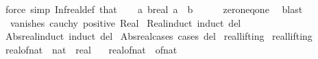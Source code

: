 \begin{isabellebody}
\ {\isacharparenleft}{\kern0pt}force\ simp{\isacharcolon}{\kern0pt}\ Inf{\isacharunderscore}{\kern0pt}real{\isacharunderscore}{\kern0pt}def\ that{\isacharparenright}{\kern0pt}\isanewline
\ \ \isamarkupfalse%
\ {\isachardoublequoteopen}{\isasymexists}a\ b{\isacharcolon}{\kern0pt}{\isacharcolon}{\kern0pt}real{\isachardot}{\kern0pt}\ a\ {\isasymnoteq}\ b{\isachardoublequoteclose}\isanewline
\ \ \ \ \isamarkupfalse%
\ zero{\isacharunderscore}{\kern0pt}neq{\isacharunderscore}{\kern0pt}one\ \isamarkupfalse%
\ blast\isanewline
{}\isamarkupfalse%
%
\endisatagproof
{\isafoldproof}%
%
\isadelimproof
\isanewline
%
\endisadelimproof
\isanewline
{}\isamarkupfalse%
%
\isadelimdocument
%
\endisadelimdocument
%
\isatagdocument
%
\isamarkuptrue%
%
\endisatagdocument
{\isafolddocument}%
%
\isadelimdocument
%
\endisadelimdocument
{}\isamarkupfalse%
\ {\isacharparenleft}{\kern0pt}\ vanishes\ cauchy\ positive\ Real\isanewline
\isanewline
{}\isamarkupfalse%
\ Real{\isacharunderscore}{\kern0pt}induct\ {\isacharbrackleft}{\kern0pt}induct\ del{\isacharbrackright}{\kern0pt}\isanewline
{}\isamarkupfalse%
\ Abs{\isacharunderscore}{\kern0pt}real{\isacharunderscore}{\kern0pt}induct\ {\isacharbrackleft}{\kern0pt}induct\ del{\isacharbrackright}{\kern0pt}\isanewline
{}\isamarkupfalse%
\ Abs{\isacharunderscore}{\kern0pt}real{\isacharunderscore}{\kern0pt}cases\ {\isacharbrackleft}{\kern0pt}cases\ del{\isacharbrackright}{\kern0pt}\isanewline
\isanewline
{}\isamarkupfalse%
\ real{\isachardot}{\kern0pt}lifting\isanewline
{}\isamarkupfalse%
\ real{\isachardot}{\kern0pt}lifting%
\isadelimdocument
%
\endisadelimdocument
%
\isatagdocument
%
\isamarkuptrue%
%
\endisatagdocument
{\isafolddocument}%
%
\isadelimdocument
%
\endisadelimdocument
{}\isamarkupfalse%
\ real{\isacharunderscore}{\kern0pt}of{\isacharunderscore}{\kern0pt}nat\ {\isacharcolon}{\kern0pt}{\isacharcolon}{\kern0pt}\ {\isachardoublequoteopen}nat\ {\isasymRightarrow}\ real{\isachardoublequoteclose}\isanewline
\ \ \ {\isachardoublequoteopen}real{\isacharunderscore}{\kern0pt}of{\isacharunderscore}{\kern0pt}nat\ {\isasymequiv}\ of{\isacharunderscore}{\kern0pt}nat{\isachardoublequoteclose}\isanewline

\end{isabellebody}
